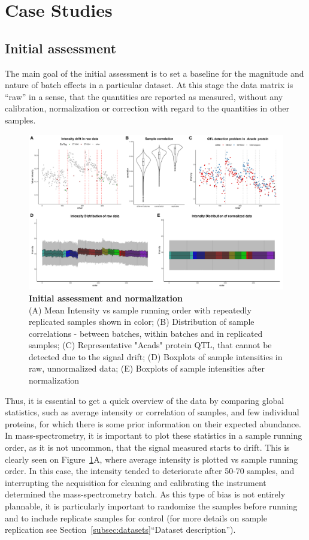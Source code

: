 \documentclass[num-refs]{wiley-article}
\begin{document}
\section{Case Studies}\label{subsec:case_studies}
\subsection{Initial assessment}
The main goal of the initial assessment is to set a baseline for the magnitude and nature of batch effects in a particular dataset. At this stage the data matrix is “raw” in a sense, that the quantities are reported as measured, without any calibration, normalization or correction with regard to the quantities in other samples.


\begin{figure}[bt]
	\includegraphics[width=\textwidth]{figures/Fig1_initial_assessment_v5_edited.pdf}
	
	\caption{\textbf{Initial assessment and normalization} \\
		(A) Mean Intensity vs sample running order with repeatedly replicated samples shown in color; (B) Distribution of sample correlations - between batches, within batches and in replicated samples; (C) Representative "Acads" protein QTL, that cannot be detected due to the signal drift; (D) Boxplots of sample intensities in raw, unnormalized data; (E) Boxplots of sample intensities after normalization}
	\label{fig:batch_fig2_initAssessment}
\end{figure}

Thus, it is essential to get a quick overview of the data by comparing global statistics, such as average intensity or correlation of samples, and few individual proteins, for which there is some prior information on their expected abundance. In mass-spectrometry, it is important to plot these statistics in a sample running order, as it is not uncommon, that the signal measured starts to drift. This is clearly seen on Figure~\ref{fig:batch_fig2_initAssessment}A, where average intensity is plotted vs sample running order. In this case, the intensity tended to deteriorate after 50-70 samples, and interrupting the acquisition for cleaning and calibrating the instrument determined the mass-spectrometry batch. As this type of bias is not entirely plannable, it is particularly important to randomize the samples before running and to include replicate samples for control (for more details on sample replication see Section~\ref{subsec:datasets}“Dataset description”). 
\end{document}
